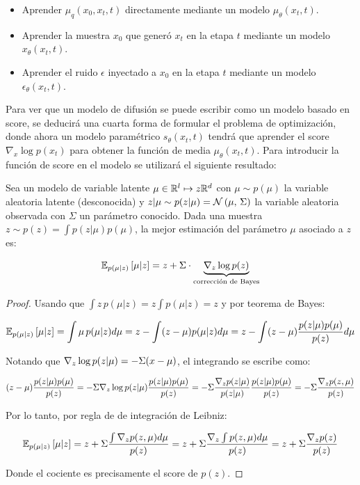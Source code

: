 \begin{itemize}
    \item Aprender $\mu_q(x_0,x_t,t)$ directamente mediante un modelo $\mu_\theta(x_t,t)$.
    \item Aprender la muestra $x_0$ que generó $x_t$ en la etapa $t$ mediante un modelo $x_\theta(x_t,t)$.
    \item Aprender el ruido $\epsilon$ inyectado a $x_0$ en la etapa $t$ mediante un modelo $\epsilon_\theta(x_t,t)$.
\end{itemize}

Para ver que un modelo de difusión se puede escribir como un modelo basado en score, se deducirá una cuarta forma de formular el problema de optimización, donde ahora un modelo paramétrico $s_\theta(x_t,t)$ tendrá que aprender el score $\nabla_x\log p(x_t)$ para obtener la función de media $\mu_\theta(x_t,t)$. Para introducir la función de score en el modelo se utilizará el siguiente resultado:

\begin{teo}
    Sea un modelo de variable latente $\mu\in\mathbb{R}^l\mapsto z\mathbb{R}^d$ con $\mu\sim p(\mu)$ la variable aleatoria latente (desconocida) y $z|\mu\sim p(z|\mu)=\mathcal{N}\left(\mu,\,\Sigma\right)$ la variable aleatoria observada con $\Sigma$ un parámetro conocido. Dada una muestra $z\sim p(z)= \int p(z|\mu) p(\mu)$, la mejor estimación del parámetro $\mu$ asociado a $z$ es:

    \begin{equation*}
        \mathbb{E}_{p(\mu|z)}\left[\mu|z\right] = z + \Sigma \cdot \underbrace{\nabla_z \log p(z)}_{\text{corrección de Bayes}}
    \end{equation*}
\end{teo}

\begin{proof}
    Usando que $\int z\,p(\mu|z) = z\int p(\mu|z)=z$ y por teorema de Bayes:

    \begin{equation*}
        \mathbb{E}_{p(\mu|z)}\left[\mu|z\right] = \int \mu\, p(\mu|z)d\mu = z - \int (z-\mu)p(\mu|z) d\mu = z - \int (z-\mu)\frac{p(z|\mu)p(\mu)}{p(z)} d\mu
    \end{equation*}

    Notando que $\nabla_{z} \log p(z|\mu) = -\Sigma (x-\mu)$, el integrando se escribe como:

    \begin{equation*}
        (z-\mu)\frac{p(z|\mu)p(\mu)}{p(z)} = -\Sigma \nabla_{z} \log p(z|\mu) \frac{p(z|\mu)p(\mu)}{p(z)} = -\Sigma \frac{\nabla_z p(z|\mu)}{p(z|\mu)} \frac{p(z|\mu)p(\mu)}{p(z)} = -\Sigma \frac{\nabla_z p(z,\mu)}{p(z)}
    \end{equation*}

    Por lo tanto, por regla de de integración de Leibniz:

    \begin{equation*}
        \mathbb{E}_{p(\mu|z)}\left[\mu|z\right] = z + \Sigma \frac{\int \nabla_z p(z,\mu)d\mu}{p(z)} = z + \Sigma \frac{\nabla_z \int p(z,\mu)d\mu}{p(z)} = z + \Sigma \frac{\nabla_z p(z)}{p(z)}
    \end{equation*}

    Donde el cociente es precisamente el score de $p(z)$.
\end{proof}

